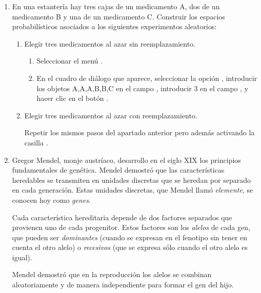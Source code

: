 \begin{enumerate}[leftmargin=*]
\item En una estantería hay tres cajas de un medicamento A, dos de un medicamento B y una de un medicamento C. 
Construir los espacios probabilísticos asociados a los siguientes experimentos aleatorios:
\begin{enumerate}
\item Elegir tres medicamentos al azar sin reemplazamiento. 
\begin{indicacion}
\begin{enumerate}
\item Seleccionar el menú .
\item En el cuadro de diálogo que aparece, seleccionar la opción , introducir los objetos A,A,A,B,B,C en
el campo , introducir 3 en el campo , y hacer clic en el botón .
\end{enumerate}
\end{indicacion}

\item Elegir tres medicamentos al azar con reemplazamiento.
\begin{indicacion}
Repetir los mismos pasos del apartado anterior pero además activando la casilla .
\end{indicacion}
\end{enumerate}

\item Gregor Mendel, monje austríaco, desarrollo en el siglo XIX los principios fundamentales de genética.
Mendel demostró que las características heredables se transmiten en unidades discretas que se heredan por separado en cada generación.
Estas unidades discretas, que Mendel llamó \emph{elemente}, se conocen hoy como \emph{genes}.

Cada característica hereditaria depende de dos factores separados que provienen uno de cada progenitor.
Estos factores son los \emph{alelos} de cada gen, que pueden ser \emph{dominantes} (cuando se expresan en el fenotipo sin tener en cuenta el
otro alelo) o \emph{recesivos} (que se expresa sólo cuando el otro alelo es igual).

Mendel demostró que en la reproducción los alelos se combinan aleatoriamente y de manera independiente para formar el gen del hijo.


\end{enumerate}
